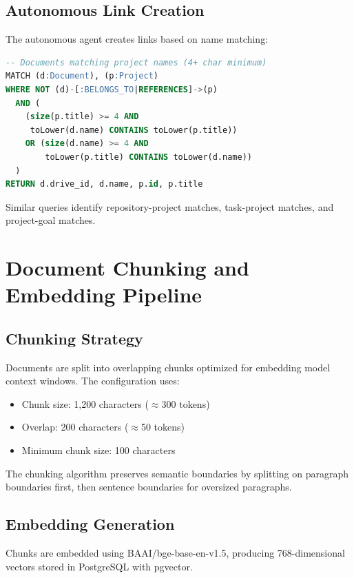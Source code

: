 \documentclass[11pt,a4paper]{article}
\begin{document}
\subsection{Autonomous Link Creation}

The autonomous agent creates links based on name matching:

\begin{lstlisting}[language=SQL]
-- Documents matching project names (4+ char minimum)
MATCH (d:Document), (p:Project)
WHERE NOT (d)-[:BELONGS_TO|REFERENCES]->(p)
  AND (
    (size(p.title) >= 4 AND
     toLower(d.name) CONTAINS toLower(p.title))
    OR (size(d.name) >= 4 AND
        toLower(p.title) CONTAINS toLower(d.name))
  )
RETURN d.drive_id, d.name, p.id, p.title
\end{lstlisting}

Similar queries identify repository-project matches, task-project matches, and project-goal matches.

\section{Document Chunking and Embedding Pipeline}
\label{sec:chunking}

\subsection{Chunking Strategy}

Documents are split into overlapping chunks optimized for embedding model context windows. The configuration uses:

\begin{itemize}
    \item Chunk size: 1,200 characters ($\approx$300 tokens)
    \item Overlap: 200 characters ($\approx$50 tokens)
    \item Minimum chunk size: 100 characters
\end{itemize}

The chunking algorithm preserves semantic boundaries by splitting on paragraph boundaries first, then sentence boundaries for oversized paragraphs.

\subsection{Embedding Generation}

Chunks are embedded using BAAI/bge-base-en-v1.5, producing 768-dimensional vectors stored in PostgreSQL with pgvector.
\end{document}
